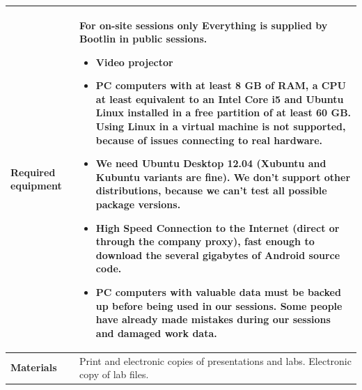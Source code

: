 \documentclass[a4paper,12pt,obeyspaces,spaces,hyphens]{article}
\begin{document}
{  \begin{tabularx}{\textwidth}{|g|h|}
    {\bf Required equipment} &
    {\bf For on-site sessions only}
    \newline Everything is supplied by Bootlin in public sessions.
    \begin{itemize}
    \item Video projector
    \item PC computers with at least 8 GB of RAM, a CPU at least
      equivalent to an Intel Core i5 and Ubuntu Linux installed in a
      {\bf free partition of at least 60 GB. Using Linux in a virtual
        machine is not supported}, because of issues connecting to
      real hardware.
    \item We need Ubuntu Desktop 12.04 (Xubuntu and Kubuntu
      variants are fine). We don't support other distributions,
      because we can't test all possible package versions.
    \item {\bf High Speed Connection to the Internet} (direct or
      through the company proxy), fast enough to download the several
      gigabytes of Android source code.
    \item {\bf PC computers with valuable data must be backed up}
      before being used in our sessions. Some people have already made
      mistakes during our sessions and damaged work data.
    \end{itemize} \\
    \hline

    {\bf Materials} & Print and electronic copies of presentations and
    labs.
    \newline Electronic copy of lab files.\\
    \hline

\end{tabularx}}
\normalsize
\end{document}
